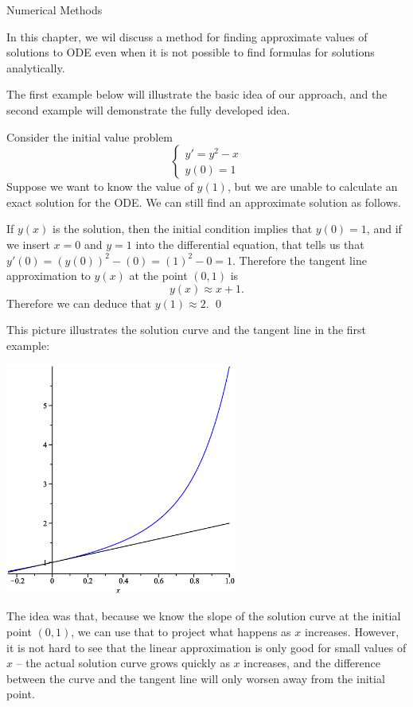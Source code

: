 \documentclass[12pt,letterpaper,twoside]{amsart}
\newcounter{example}
\newcounter{exercise}
\newcounter{problem}
\newcommand{\example}{\bigskip \noindent {\large {\sc Example \arabic{example}:}} \addtocounter{example}{1}}
\begin{document}
\sffamily

\begin{center} {\LARGE Numerical Methods} \end{center}

\setcounter{example}{1}
\setcounter{exercise}{1}

In this chapter, we wil discuss a method for finding approximate values of solutions to ODE even when it is not possible to find formulas for solutions analytically.

The first example below will illustrate the basic idea of our approach, and the second example will demonstrate the fully developed idea.

\example Consider the initial value problem
\[ \left\{ \begin{matrix} y'=y^2-x \\ y(0)=1 \end{matrix} \right.\]
Suppose we want to know the value of $y(1)$, but we are unable to calculate an exact solution for the ODE.  We can still find an approximate solution as follows.

If $y(x)$ is the solution, then the initial condition implies that $y(0)=1$, and if we insert $x=0$ and $y=1$ into the differential equation, that tells us that $y'(0)=(y(0))^2-(0)=(1)^2-0=1$.  Therefore the tangent line approximation to $y(x)$ at the point $(0,1)$ is 
\[ y(x) \approx x+1.\]
Therefore we can deduce that $y(1)\approx 2$.
\qed

This picture illustrates the solution curve and the tangent line in the first example:
\begin{center}
\includegraphics[width=3in]{example1.eps}
\end{center}
The idea was that, because we know the slope of the solution curve at the initial point $(0,1)$, we can use that to project what happens as $x$ increases.  However, it is not hard to see that the linear approximation is only good for small values of $x$ -- the actual solution curve grows quickly as $x$ increases, and the difference between the curve and the tangent line will only worsen away from the initial point.
\end{document}
